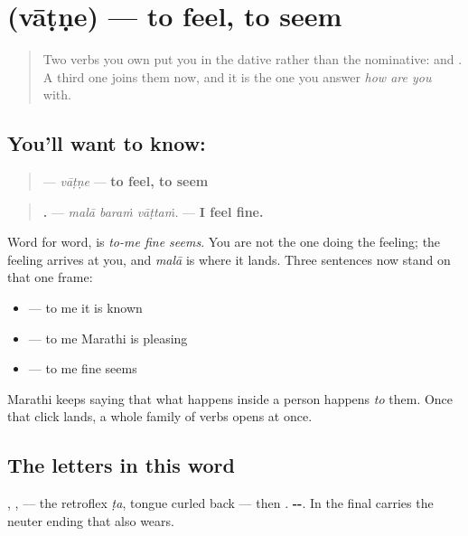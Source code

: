 \section[vāṭṇe]{ (vāṭṇe) — to feel, to seem}

\label{lesson:MR-C23-vatne}



\begin{quote}
Two verbs you own put you in the dative rather than the nominative: \textbf{  } and \textbf{  }. A third one joins them now, and it is the one you answer \emph{how are you} with.
\end{quote}

\subsection*{You'll want to know: }
\begin{quote}
\textbf{} — \emph{vāṭṇe} — \textbf{to feel, to seem}
\end{quote}

\begin{quote}
\textbf{  .} — \emph{malā baraṁ vāṭtaṁ.} — \textbf{I feel fine.}
\end{quote}

\begin{grammarlens}[title={Grammar Lens: the third verb that puts you in the dative}]
Word for word, \textbf{  } is \emph{to-me fine seems}. You are not the one doing the feeling; the feeling arrives at you, and \textbf{} \emph{malā} is where it lands. Three sentences now stand on that one frame:

\begin{itemize}
\raggedright
  \item \textbf{  } — to me it is known
  \item \textbf{  } — to me Marathi is pleasing
  \item \textbf{  } — to me fine seems
\end{itemize}

Marathi keeps saying that what happens inside a person happens \emph{to} them. Once that click lands, a whole family of verbs opens at once.
\end{grammarlens}

\subsection*{The letters in this word}
\textbf{}, \textbf{}, \textbf{} — the retroflex \emph{ṭa}, tongue curled back — then \textbf{}. \textbf{--}. In \textbf{} the final \textbf{} carries the neuter ending that \textbf{} also wears.


